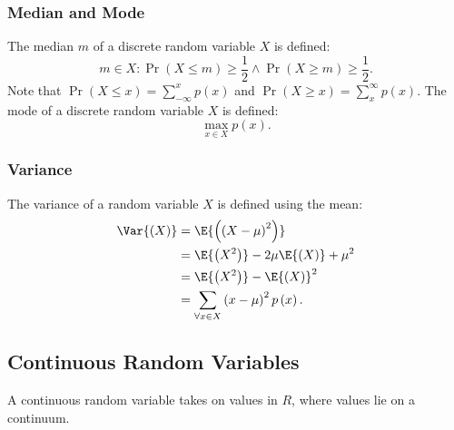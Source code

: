 \documentclass{article}
\begin{document}
\subsubsection{Median and Mode}
The median \(m\) of a discrete random variable \(X\) is defined:
\begin{equation*}
    m \in X : \Pr{\left( X \leq m \right)} \geq \frac{1}{2} \land \Pr{\left( X \geq m \right)} \geq \frac{1}{2}.
\end{equation*}
Note that \(\Pr{\left( X \leq x \right)} = \sum_{-\infty}^x p\left( x \right)\) and \(\Pr{\left( X \geq x \right)} = \sum_x^\infty p\left( x \right)\). The mode of a discrete random variable \(X\) is defined:
\begin{equation*}
    \max_{x \in X} p\left( x \right).
\end{equation*}
\subsubsection{Variance}
The variance of a random variable \(X\) is defined using the mean:
\begin{align*}
    \Var{\left( X \right)} & = \E{\left( \left( X - \mu \right)^2 \right)}                        \\
                           & = \E{\left( X^2 \right)} - 2 \mu \E{\left( X \right)} + \mu^2        \\
                           & = \E{\left( X^2 \right)} - \E{\left( X \right)}^2                    \\
                           & = \sum_{\forall x \in X} \left( x - \mu \right)^2 p\left( x \right).
\end{align*}
\subsection{Continuous Random Variables}
\begin{definition}
    A continuous random variable takes on values in \(R\), where values
    lie on a continuum.
\end{definition}
\end{document}

